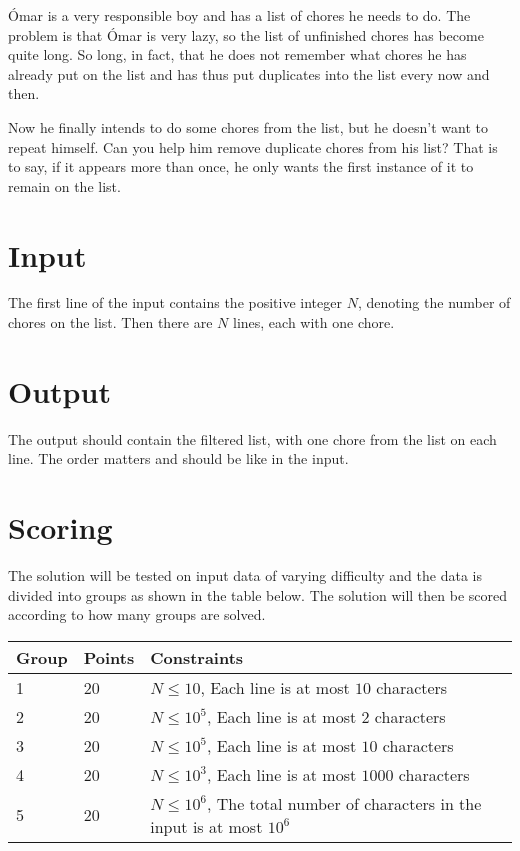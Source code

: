 

Ómar is a very responsible boy and has a list of chores he needs to do. The problem
is that Ómar is very lazy, so the list of unfinished chores has become quite long.
So long, in fact, that he does not remember what chores he has already put on the
list and has thus put duplicates into the list every now and then.

Now he finally intends to do some chores from the list, but he doesn't want to
repeat himself. Can you help him remove duplicate chores from his list? That is
to say, if it appears more than once, he only wants the first instance of it
to remain on the list.

\section*{Input}
The first line of the input contains the positive integer $N$, denoting the number
of chores on the list. Then there are $N$ lines, each with one chore.

\section*{Output}
The output should contain the filtered list, with one chore from the list on each line.
The order matters and should be like in the input.

\section*{Scoring}
The solution will be tested on input data of varying difficulty and the data is
divided into groups as shown in the table below. The solution will then be
scored according to how many groups are solved.

\begin{tabular}{|l|l|l|l|}
\hline
Group & Points & Constraints \\ \hline
1     & 20 & $N \leq 10$, Each line is at most $10$ characters  \\ \hline
2     & 20 & $N \leq 10^5$, Each line is at most $2$ characters \\ \hline
3     & 20 & $N \leq 10^5$, Each line is at most $10$ characters  \\ \hline
4     & 20 & $N \leq 10^3$, Each line is at most $1000$ characters  \\ \hline
5     & 20 & $N \leq 10^6$, The total number of characters in the input is at most $10^6$ \\ \hline
\end{tabular}

